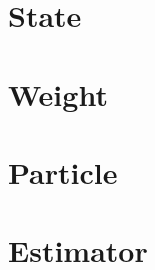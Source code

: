 \section{State}
\label{sec:State}

\section{Weight}
\label{sec:Weight}

\section{Particle}
\label{sec:Particle}

\section{Estimator}
\label{sec:Estimator}
